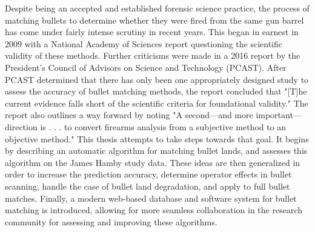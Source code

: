 
Despite being an accepted and established forensic science practice, the process of matching bullets to determine whether they were fired from the same gun barrel has come under fairly intense scrutiny in recent years. This began in earnest in 2009 with a National Academy of Sciences report questioning the scientific validity of these methods. Further criticisms were made in a 2016 report by the President's Council of Advisors on Science and Technology (PCAST). After PCAST determined that there has only been one appropriately designed study to assess the accuracy of bullet matching methods, the report concluded that "[T]he current evidence falls short of the scientific criteria for foundational validity." The report also outlines a way forward by noting "A second—and more important—direction is . . . to convert firearms analysis from a subjective method to an objective method." This thesis attempts to take steps towards that goal. It begins by describing an automatic algorithm for matching bullet lands, and assesses this algorithm on the James Hamby study data. These ideas are then generalized in order to increase the prediction accuracy, determine operator effects in bullet scanning, handle the case of bullet land degradation, and apply to full bullet matches. Finally, a modern web-based database and software system for bullet matching is introduced, allowing for more seamless collaboration in the research community for assessing and improving these algorithms.
